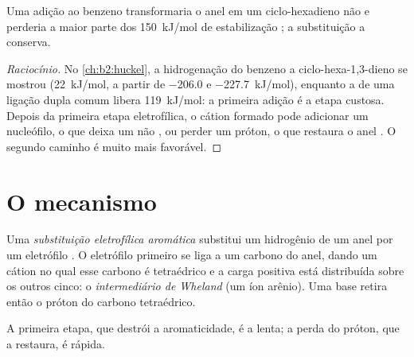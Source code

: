 \begin{proposition}\label{prop:b2:aromatic-substitution:no-addition}
Uma adição ao benzeno transformaria o anel  em um ciclo-hexadieno não
 e perderia a maior parte dos \qty{150}{kJ/mol} de estabilização
; a substituição a conserva.
\end{proposition}

\begin{proof}[Raciocínio]
No \cref{ch:b2:huckel}, a hidrogenação do benzeno a ciclo-hexa-1,3-dieno se
mostrou  (\qty{+22}{kJ/mol}, a partir de \qty{-206.0}{} e
\qty{-227.7}{kJ/mol}), enquanto a de uma ligação dupla comum libera
\qty{119}{kJ/mol}: a primeira adição é a etapa custosa. Depois da primeira
etapa eletrofílica, o cátion formado pode adicionar um nucleófilo, o que deixa
um  não , ou perder um próton, o que restaura o anel . O
segundo caminho é muito mais favorável.
\end{proof}

\section{O mecanismo}

\begin{definition}\label{def:b2:aromatic-substitution:seAr}
Uma \emph{substituição eletrofílica aromática}
substitui um hidrogênio de um anel  por um eletrófilo . O
eletrófilo primeiro se liga a um carbono do anel, dando um cátion no qual esse
carbono é tetraédrico e a carga positiva está distribuída sobre os outros
cinco: o \emph{intermediário de Wheland}
(um íon arênio). Uma base retira então o próton do carbono tetraédrico.
\end{definition}

\begin{proposition}\label{prop:b2:aromatic-substitution:mechanism}
A primeira etapa, que destrói a aromaticidade, é a lenta; a perda do próton,
que a restaura, é rápida.
\end{proposition}

